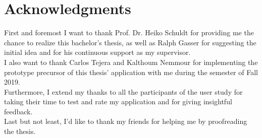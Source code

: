 \chapter{Acknowledgments}


First and foremost I want to thank Prof. Dr. Heiko Schuldt for providing me the chance to realize this bachelor's thesis, as well as Ralph Gasser for suggesting the initial idea and for his continuous support as my supervisor.\\
I also want to thank Carlos Tejera and Kalthoum Nemmour for implementing the prototype precursor of this thesis' application with me during the semester of Fall 2019.\\
Furthermore, I extend my thanks to all the participants of the user study for taking their time to test and rate my application and for giving insightful feedback.\\
Last but not least, I'd like to thank my friends for helping me by proofreading the thesis.